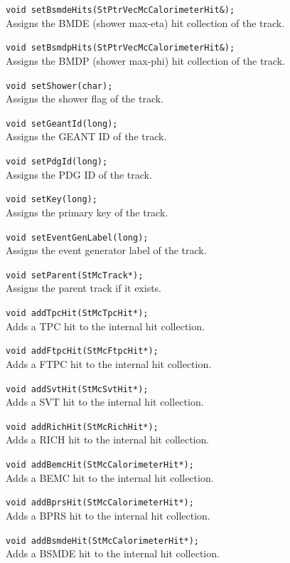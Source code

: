 \begin{Entry}
    \verb+void setBsmdeHits(StPtrVecMcCalorimeterHit&);+\\
    Assigns the BMDE (shower max-eta) hit collection of the track.

    \verb+void setBsmdpHits(StPtrVecMcCalorimeterHit&);+\\
    Assigns the BMDP (shower max-phi) hit collection of the track.

    \verb+void setShower(char);+\\
    Assigns the shower flag of the track.

    \verb+void setGeantId(long);+\\
    Assigns the GEANT ID of the track.

    \verb+void setPdgId(long);+\\
    Assigns the PDG ID of the track.

    \verb+void setKey(long);+\\
    Assigns the primary key of the track.

    \verb+void setEventGenLabel(long);+\\
    Assigns the event generator label of the track.

    \verb+void setParent(StMcTrack*);+\\
    Assigns the parent track if it exists.

    \verb+void addTpcHit(StMcTpcHit*);+\\
    Adds a TPC hit to the internal hit collection.
    
    \verb+void addFtpcHit(StMcFtpcHit*);+\\
    Adds a FTPC hit to the internal hit collection.

    \verb+void addSvtHit(StMcSvtHit*);+\\
    Adds a SVT hit to the internal hit collection.

    \verb+void addRichHit(StMcRichHit*);+\\
    Adds a RICH hit to the internal hit collection.

    \verb+void addBemcHit(StMcCalorimeterHit*);+\\
    Adds a BEMC hit to the internal hit collection.

    \verb+void addBprsHit(StMcCalorimeterHit*);+\\
    Adds a BPRS hit to the internal hit collection.

    \verb+void addBsmdeHit(StMcCalorimeterHit*);+\\
    Adds a BSMDE hit to the internal hit collection.


\end{Entry}
